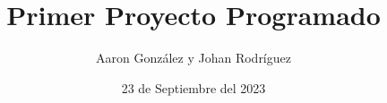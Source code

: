 \documentclass{lib/preamble}
\begin{document}

\title{Primer Proyecto Programado}
\author{Aaron González y Johan Rodríguez}
\date{23 de Septiembre del 2023}

\maketitle





\end{document}
